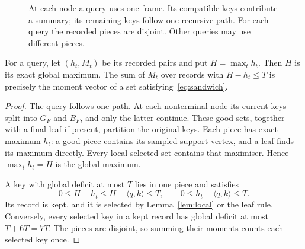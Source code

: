 \documentclass[notab,a4paper,UKenglish,numberwithinsect]{socg-lipics-v2021}
\newcommand{\ip}[2]{\langle #1,#2\rangle}
\begin{document}
\begin{figure}[t]
\centering
{}
\addtocounter{linenumber}{10}
\caption{At each node a query uses one frame. Its compatible keys contribute a summary; its remaining keys follow one recursive path. For each query the recorded pieces are disjoint. Other queries may use different pieces.}
\label{fig:recursion}
\end{figure}

\begin{lemma}\label{lem:deferred}
For a query, let $(h_t,M_t)$ be its recorded pairs and put $H=\max_t h_t$. Then $H$ is its exact global maximum. The sum of $M_t$ over records with $H-h_t\le T$ is precisely the moment vector of a set satisfying~\eqref{eq:sandwich}.
\end{lemma}
\begin{proof}
The query follows one path. At each nonterminal node its current keys split into $G_F$ and $B_F$, and only the latter continue. These good sets, together with a final leaf if present, partition the original keys. Each piece has exact maximum $h_t$: a good piece contains its sampled support vertex, and a leaf finds its maximum directly. Every local selected set contains that maximiser. Hence $\max_t h_t=H$ is the global maximum.

A key with global deficit at most $T$ lies in one piece and satisfies
\[
 0\le H-h_t\le H-\ip qk\le T,\qquad
 0\le h_t-\ip qk\le T.
\]
Its record is kept, and it is selected by Lemma~\ref{lem:local} or the leaf rule. Conversely, every selected key in a kept record has global deficit at most $T+6T=7T$. The pieces are disjoint, so summing their moments counts each selected key once.
\end{proof}
\end{document}
